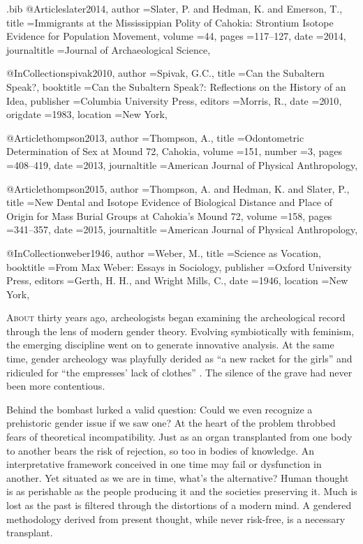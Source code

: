 \begin{filecontents}{\IJSRAidentifier.bib}
@Article{slater2014,
	author       ={Slater, P. and Hedman, K. and Emerson, T.},
	title        ={Immigrants at the Mississippian Polity of Cahokia: Strontium Isotope Evidence for Population Movement},
	volume       ={44},
	pages        ={117--127},
	date         ={2014},
	journaltitle ={Journal of Archaeological Science},
}

@InCollection{spivak2010,
	author       ={Spivak, G.C.},
	title        ={Can the Subaltern Speak?},
	booktitle    ={Can the Subaltern Speak?: Reflections on the History of an Idea},
	publisher    ={Columbia University Press},
	editors      ={Morris, R.},
	date         ={2010},
	origdate     ={1983},
	location     ={New York},
}

@Article{thompson2013,
	author       ={Thompson, A.},
	title        ={Odontometric Determination of Sex at Mound 72, Cahokia},
	volume       ={151},
	number       ={3},
	pages        ={408--419},
	date         ={2013},
	journaltitle ={American Journal of Physical Anthropology},
}

@Article{thompson2015,
	author       ={Thompson, A. and Hedman, K. and Slater, P.},
	title        ={New Dental and Isotope Evidence of Biological Distance and Place of Origin for Mass Burial Groups at Cahokia’s Mound 72},
	volume       ={158},
	pages        ={341--357},
	date         ={2015},
	journaltitle ={American Journal of Physical Anthropology},
}

@InCollection{weber1946,
	author       ={Weber, M.},
	title        ={Science as Vocation},
	booktitle    ={From Max Weber: Essays in Sociology},
	publisher    ={Oxford University Press},
	editors      ={Gerth, H. H., and Wright Mills, C.},
	date         ={1946},
	location     ={New York},
}
\end{filecontents}
\IJSRAopening%
\lettrine{A}{bout} thirty years ago, archeologists began examining the archeological record through the lens of modern gender theory. Evolving symbiotically with feminism, the emerging discipline went on to generate innovative analysis. At the same time, gender archeology was playfully derided as \enquote{a new racket for the girls} and ridiculed for \enquote{the empresses' lack of clothes} \parencite[321]{bahn1992}. The silence of the grave had never been more contentious. 

Behind the bombast lurked a valid question: Could we even recognize a prehistoric gender issue if we saw one? At the heart of the problem throbbed fears of theoretical incompatibility. Just as an organ transplanted from one body to another bears the risk of rejection, so too in bodies of knowledge. An interpretative framework conceived in one time may fail or dysfunction in another. Yet situated as we are in time, what's the alternative? Human thought is as perishable as the people producing it and the societies preserving it. Much is lost as the past is filtered through the distortions of a modern mind. A gendered methodology derived from present thought, while never risk-free, is a necessary transplant. 

